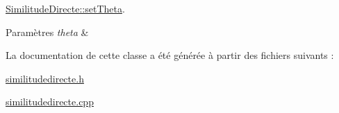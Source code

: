 \hyperlink{class_similitude_directe_af64456a45860433f87d823a62fb2493d}{Similitude\+Directe\+::set\+Theta}. 


\begin{DoxyParams}{Paramètres}
{\em theta} & \\
\hline
\end{DoxyParams}


La documentation de cette classe a été générée à partir des fichiers suivants \+:\begin{DoxyCompactItemize}
\item 
\hyperlink{similitudedirecte_8h}{similitudedirecte.\+h}\item 
\hyperlink{similitudedirecte_8cpp}{similitudedirecte.\+cpp}\end{DoxyCompactItemize}
